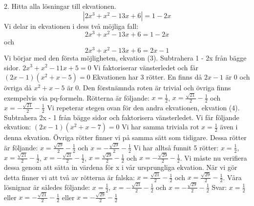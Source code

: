 \documentclass{article}
\begin{document}
  2. Hitta alla lösningar till ekvationen. 
  \begin{equation}
      |2x^3 + x^2 - 13x + 6| = 1 - 2x
  \end{equation}
  Vi delar in ekvationen i dess två möjliga fall:
  \begin{equation}
      2x^3 + x^2 - 13x + 6 = 1 - 2x
  \end{equation}
  och 
  \begin{equation}
      2x^3 + x^2 - 13x + 6 = 2x - 1
  \end{equation}
  Vi börjar med den första möjligheten, ekvation (3). Subtrahera 1 - 2x från bägge sidor. \newline \newline
  $2x^3 + x^2 - 11x + 5 = 0$ \newline \newline
  Vi faktoriserar vänsterledet och får \newline \newline
  $(2x - 1)(x^2 + x - 5) = 0$ \newline \newline
  Ekvationen har 3 rötter. En finns då $2x - 1$ är 0 och övriga då $x^2 + x - 5$ är 0. Den förstnämnda roten är trivial och övriga finns exempelvis via pq-formeln. Rötterna är följande: $x = \frac{1}{2}$, $x = \frac{\sqrt{21}}{2} - \frac{1}{2}$ och $x = -\frac{\sqrt{21}}{2} - \frac{1}{2}$ \newline \newline
  Vi repeterar stegen ovan för den andra ekvationen, ekvation (4). Subtrahera 2x - 1 från bägge sidor och faktorisera vänsterledet. Vi får följande ekvation:\newline \newline
  $(2x - 1)(x^2 + x - 7) = 0$ \newline \newline
  Vi har samma triviala rot $x = \frac{1}{2}$ även i denna ekvation. Övriga rötter finner vi på samma sätt som tidigare. Dessa rötter är följande: $x = \frac{\sqrt{29}}{2} - \frac{1}{2}$ och $x = -\frac{\sqrt{29}}{2} - \frac{1}{2}$ \newline \newline
  Vi har alltså funnit 5 rötter: $x = \frac{1}{2}$, $x = \frac{\sqrt{21}}{2} - \frac{1}{2}$, $x = -\frac{\sqrt{21}}{2} - \frac{1}{2}$, $x = \frac{\sqrt{29}}{2} - \frac{1}{2}$ och $x = -\frac{\sqrt{29}}{2} - \frac{1}{2}$. Vi måste nu verifiera dessa genom att sätta in värdena för x i vår ursprungliga ekvation. När vi gör detta finner vi att två av rötterna är falska: $x = \frac{\sqrt{21}}{2} - \frac{1}{2}$ och $x = \frac{\sqrt{29}}{2} - \frac{1}{2}$. Våra lösnignar är således följande: $x = \frac{1}{2}$, $x = -\frac{\sqrt{21}}{2} - \frac{1}{2}$ och $x = -\frac{\sqrt{29}}{2} - \frac{1}{2}$ \newline \newline
  Svar: $x = \frac{1}{2}$ eller $x = -\frac{\sqrt{21}}{2} - \frac{1}{2}$ eller $x = -\frac{\sqrt{29}}{2} - \frac{1}{2}$\newline \newline
  
\end{document}
